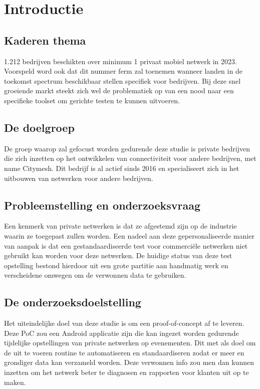 
\section{Introductie}%
\label{sec:introductie}

\subsection{Kaderen thema}

1.212 bedrijven beschikten over minimum 1 privaat mobiel netwerk in 2023. Voorspeld word ook dat dit nummer ferm zal toenemen wanneer landen in de toekomst spectrum beschikbaar stellen specifiek voor bedrijven. \autocite{Dux2023} Bij deze snel groeiende markt steekt zich wel de problematiek op van een nood naar een specifieke toolset om gerichte testen te kunnen uitvoeren.

\subsection{De doelgroep}

De groep waarop zal gefocust worden gedurende deze studie is private bedrijven die zich inzetten op het ontwikkelen van connectiviteit voor andere bedrijven, met name Citymesh. Dit bedrijf is al actief sinds 2016 en specialiseert zich in het uitbouwen van netwerken voor andere bedrijven. \autocite{Cassauwers2019}

\subsection{Probleemstelling en onderzoeksvraag}

Een kenmerk van private netwerken is dat ze afgestemd zijn op de industrie waarin ze toegepast zullen worden. Een nadeel aan deze gepersonaliseerde manier van aanpak is dat een gestandaardiseerde test voor commerciële netwerken niet gebruikt kan worden voor deze netwerken. De huidige status van deze test opstelling bestond hierdoor uit een grote partitie aan handmatig werk en verscheidene omwegen om de verwonnen data te gebruiken.

\subsection{De onderzoeksdoelstelling}

Het uiteindelijke doel van deze studie is om een proof-of-concept af te leveren. Deze PoC zou een Android applicatie zijn die kan ingezet worden gedurende tijdelijke opstellingen van private netwerken op evenementen. Dit met als doel om de uit te voeren routine te automatiseren en standaardiseren zodat er meer en grondiger data kan verzameld worden. Deze verwonnen info zou men dan kunnen inzetten om het netwerk beter te diagnosen en rapporten voor klanten uit op te maken.

